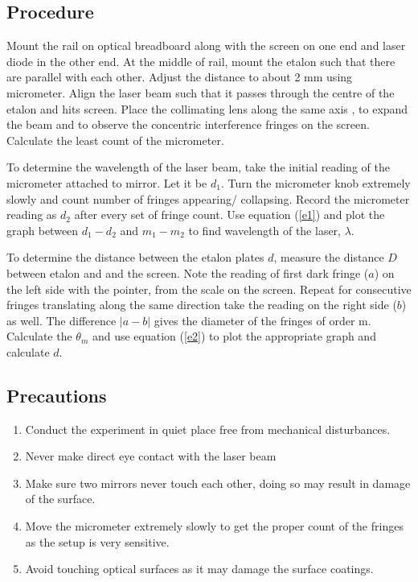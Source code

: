 \documentclass[a4paper, amsfonts, amssymb, amsmath, reprint, showkeys, nofootinbib, twoside]{revtex4-1}
\begin{document}
\subsection{Procedure}
Mount the rail on optical breadboard along with the screen on one end and laser diode in the other end. At the middle of rail, mount the etalon such that there are parallel with each other. Adjust the distance to about 2 mm using micrometer. Align the laser beam such that it passes through the centre of the etalon and hits screen. Place the collimating lens along the same axis , to expand the beam and to observe the concentric interference fringes on the screen. Calculate the least count of the micrometer.

To determine the wavelength of the laser beam, take the initial reading of the micrometer attached to mirror. Let it be $d_1$. Turn the micrometer knob extremely slowly and count number of fringes appearing/ collapsing. Record the micrometer reading as $d_2$ after every set of fringe count. Use equation (\ref{e1}) and plot the graph between $d_1-d_2$ and $m_1-m_2$ to find wavelength of the laser, $\lambda$.

To determine the distance between the etalon plates $d$, measure the distance $D$ between etalon and and the screen. Note the reading of first dark fringe ($a$) on the left side with the pointer, from the scale on the screen. Repeat for consecutive fringes translating along the same direction take the reading on the right side ($b$) as well. The difference $|a-b|$ gives the diameter of the fringes of order m. Calculate the $\theta_m$ and use equation (\ref{e2}) to plot the appropriate graph and calculate $d$.

\subsection{Precautions}
\begin{enumerate}
\item{Conduct the experiment in quiet place free from mechanical disturbances.}
\item{Never make direct eye contact with the laser beam}
\item{Make sure two mirrors never touch each other, doing so may result in damage of the surface.}
\item{Move the micrometer extremely slowly to get the proper count of the fringes as the setup is very sensitive.}
\item{Avoid touching optical surfaces as it may damage the surface coatings.}
\end{enumerate}
\end{document}
